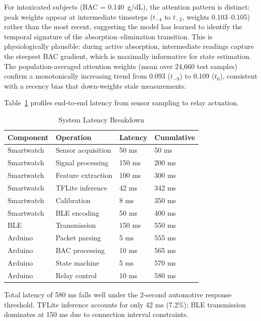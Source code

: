 \documentclass[HARVARD,Times2COL]{WileyNJDv5} %
\providecommand{\DIFadd}[1]{{\protect\color{red} #1}} %
\providecommand{\DIFaddend}{} %
\DeclareRobustCommand{\DIFaddend}{\DIFOaddend \let\includegraphics\DIFOincludegraphics} %
\begin{document}
\DIFadd{For intoxicated subjects (BAC = 0.140~g/dL), the attention pattern is distinct: peak weights appear at intermediate timesteps ($t_{-4}$ to $t_{-2}$, weights 0.103--0.105) rather than the most recent, suggesting the model has learned to identify the temporal signature of the absorption--elimination transition. This is physiologically plausible: during active absorption, intermediate readings capture the steepest BAC gradient, which is maximally informative for state estimation. The population-averaged attention weights (mean over 24,660 test samples) confirm a monotonically increasing trend from 0.093 ($t_{-9}$) to 0.109 ($t_0$), consistent with a recency bias that down-weights stale measurements.
}

\DIFaddend %
Table~\ref{tab:latency} profiles end-to-end latency from sensor sampling to relay actuation.

\begin{table}[htbp]
\caption{System Latency Breakdown}
\label{tab:latency}
\centering
\small
\begin{tabular}{@{}llll@{}}
\toprule
\textbf{Component} & \textbf{Operation} & \textbf{Latency} & \textbf{Cumulative} \\
\midrule
Smartwatch & Sensor acquisition & 50 ms & 50 ms \\
Smartwatch & Signal processing & 150 ms & 200 ms \\
Smartwatch & Feature extraction & 100 ms & 300 ms \\
Smartwatch & TFLite inference & 42 ms & 342 ms \\
Smartwatch & Calibration & 8 ms & 350 ms \\
Smartwatch & BLE encoding & 50 ms & 400 ms \\
BLE & Transmission & 150 ms & 550 ms \\
Arduino & Packet parsing & 5 ms & 555 ms \\
Arduino & BAC processing & 10 ms & 565 ms \\
Arduino & State machine & 5 ms & 570 ms \\
Arduino & Relay control & 10 ms & 580 ms \\
\bottomrule
\end{tabular}
\end{table}

Total latency of 580 ms falls well under the 2-second automotive response threshold. TFLite inference accounts for only 42 ms (7.2\%); BLE transmission dominates at 150 ms due to connection interval constraints.
\end{document}
